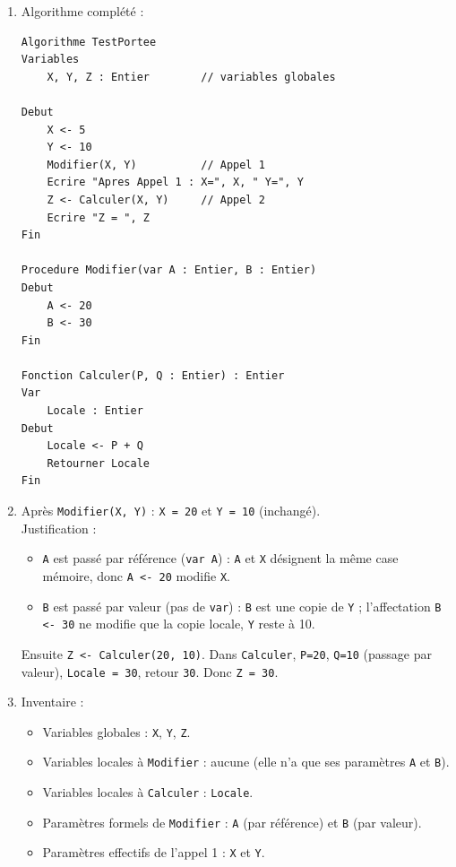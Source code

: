 \documentclass[11pt]{article}
\newcommand{\cle}[1]{{\popxbold\color{popdark}#1}}
\begin{document}
\begin{corrige}
\begin{enumerate}
    \item Algorithme complété :
\begin{lstlisting}
Algorithme TestPortee
Variables
    X, Y, Z : Entier        // variables globales

Debut
    X <- 5
    Y <- 10
    Modifier(X, Y)          // Appel 1
    Ecrire "Apres Appel 1 : X=", X, " Y=", Y
    Z <- Calculer(X, Y)     // Appel 2
    Ecrire "Z = ", Z
Fin

Procedure Modifier(var A : Entier, B : Entier)
Debut
    A <- 20
    B <- 30
Fin

Fonction Calculer(P, Q : Entier) : Entier
Var
    Locale : Entier
Debut
    Locale <- P + Q
    Retourner Locale
Fin
\end{lstlisting}
    \item Après \texttt{Modifier(X, Y)} : \texttt{X = 20} et \texttt{Y = 10} (inchangé).\\
    Justification :
    \begin{itemize}
        \item \texttt{A} est passé \cle{par référence} (\texttt{var A}) : \texttt{A} et \texttt{X} désignent la même case mémoire, donc \texttt{A <- 20} modifie \texttt{X}.
        \item \texttt{B} est passé \cle{par valeur} (pas de \texttt{var}) : \texttt{B} est une copie de \texttt{Y} ; l'affectation \texttt{B <- 30} ne modifie que la copie locale, \texttt{Y} reste à 10.
    \end{itemize}
    Ensuite \texttt{Z <- Calculer(20, 10)}. Dans \texttt{Calculer}, \texttt{P=20}, \texttt{Q=10} (passage par valeur), \texttt{Locale = 30}, retour \texttt{30}. Donc \texttt{Z = 30}.
    \item Inventaire :
    \begin{itemize}
        \item Variables globales : \texttt{X}, \texttt{Y}, \texttt{Z}.
        \item Variables locales à \texttt{Modifier} : aucune (elle n'a que ses paramètres \texttt{A} et \texttt{B}).
        \item Variables locales à \texttt{Calculer} : \texttt{Locale}.
        \item Paramètres formels de \texttt{Modifier} : \texttt{A} (par référence) et \texttt{B} (par valeur).
        \item Paramètres effectifs de l'appel 1 : \texttt{X} et \texttt{Y}.
    \end{itemize}
\end{enumerate}
\end{corrige}
\end{document}
